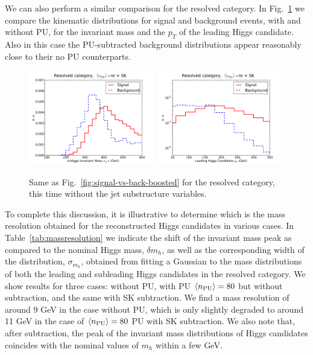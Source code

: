 We can also perform a similar comparison for
the resolved category.
%
In Fig.~\ref{fig:signal-vs-back-resolved} we compare
the kinematic distributions for signal and background events,
     with and without PU, for the invariant mass and the $p_T$ of the leading
     Higgs candidate.
     Also in this
     case the PU-subtracted background distributions appear reasonably close
     to their no PU counterparts.

\begin{figure}[t]
  \begin{center}
   \includegraphics[width=0.49\textwidth]{plots/m_h0_res_comp_back.pdf}
  \includegraphics[width=0.49\textwidth]{plots/pt_h0_res_comp_back.pdf}
     \caption{\small
       Same as Fig.~\ref{fig:signal-vs-back-boosted} for the resolved category,
       this time without the jet substructure variables.
}
\label{fig:signal-vs-back-resolved}
\end{center}
\end{figure}

To complete this discussion, it is illustrative to determine
which is the mass resolution obtained for the
reconstructed Higgs candidates in various cases.
%
In Table~\ref{tab:massresolution}
we indicate the shift of the invariant mass peak as compared
to the nominal Higgs mass, $\delta m_h$, as well as the
corresponding width of the distribution, $\sigma_{m_h}$,
obtained from fitting a Gaussian to the mass distributions
of both the leading and subleading Higgs candidates in
the resolved category.
        We show results for three cases: without PU, with PU $\left\langle n_{\rm PU}\right\rangle=80$
        but without subtraction, and the same with SK subtraction.
%
        We find a mass resolution of around 9 GeV in the case
        without PU, which is only slightly degraded
        to around 11 GeV in the case of $\left\langle n_{\rm PU}\right\rangle=80$ PU
        with SK subtraction.
        We also note that, after subtraction, the peak of
        the invariant mass distributions of Higgs candidates
        coincides with the nominal values of $m_h$ within a few GeV.

